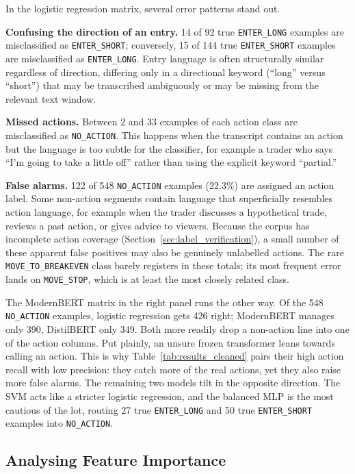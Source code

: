 In the logistic regression matrix, several error patterns stand out.

\textbf{Confusing the direction of an entry.} 14 of 92 true \texttt{ENTER\_LONG} examples are misclassified as \texttt{ENTER\_SHORT}; conversely, 15 of 144 true \texttt{ENTER\_SHORT} examples are misclassified as \texttt{ENTER\_LONG}. Entry language is often structurally similar regardless of direction, differing only in a directional keyword (``long'' versus ``short'') that may be transcribed ambiguously or may be missing from the relevant text window.

\textbf{Missed actions.} Between 2 and 33 examples of each action class are misclassified as \texttt{NO\_ACTION}. This happens when the transcript contains an action but the language is too subtle for the classifier, for example a trader who says ``I'm going to take a little off'' rather than using the explicit keyword ``partial.''

\textbf{False alarms.} 122 of 548 \texttt{NO\_ACTION} examples (22.3\%) are assigned an action label. Some non-action segments contain language that superficially resembles action language, for example when the trader discusses a hypothetical trade, reviews a past action, or gives advice to viewers. Because the corpus has incomplete action coverage (Section~\ref{sec:label_verification}), a small number of these apparent false positives may also be genuinely unlabelled actions. The rare \texttt{MOVE\_TO\_BREAKEVEN} class barely registers in these totals; its most frequent error lands on \texttt{MOVE\_STOP}, which is at least the most closely related class.

The ModernBERT matrix in the right panel runs the other way. Of the 548 \texttt{NO\_ACTION} examples, logistic regression gets 426 right; ModernBERT manages only 390, DistilBERT only 349. Both more readily drop a non-action line into one of the action columns. Put plainly, an unsure frozen transformer leans towards calling an action. This is why Table~\ref{tab:results_cleaned} pairs their high action recall with low precision: they catch more of the real actions, yet they also raise more false alarms. The remaining two models tilt in the opposite direction. The SVM acts like a stricter logistic regression, and the balanced MLP is the most cautious of the lot, routing 27 true \texttt{ENTER\_LONG} and 50 true \texttt{ENTER\_SHORT} examples into \texttt{NO\_ACTION}.

\subsection{Analysing Feature Importance}
\label{sec:feature_importance}

